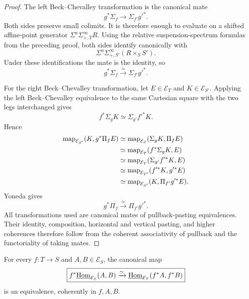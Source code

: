 \begin{proof}
The left Beck--Chevalley transformation is the canonical mate
\[
    g^*\Sigma_f\longrightarrow \Sigma_{f'} g'^*.
\]
Both sides preserve small colimits.  It is therefore enough to evaluate on a shifted affine-point
generator \(\Sigma^a\Sigma^\infty_{+,T}R\).  Using the relative suspension-spectrum formulas from
the preceding proof, both sides identify canonically with
\[
    \Sigma^a\Sigma^\infty_{+,S'}(R\times_SS').
\]
Under these identifications the mate is the identity, so
\[
    g^*\Sigma_f\xrightarrow{\simeq}\Sigma_{f'} g'^*.
\]

For the right Beck--Chevalley transformation, let \(E\in\mathcal E_T\) and
\(K\in\mathcal E_{S'}\).  Applying the left Beck--Chevalley equivalence to the same Cartesian
square with the two legs interchanged gives
\[
    f^*\Sigma_g K\simeq \Sigma_{g'} f'^*K.
\]
Hence
\[
\begin{aligned}
    \operatorname{map}_{\mathcal E_{S'}}(K,g^*\Pi_f E)
    &\simeq
    \operatorname{map}_{\mathcal E_S}(\Sigma_g K,\Pi_f E)
    \\
    &\simeq
    \operatorname{map}_{\mathcal E_T}(f^*\Sigma_g K,E)
    \\
    &\simeq
    \operatorname{map}_{\mathcal E_T}(\Sigma_{g'} f'^*K,E)
    \\
    &\simeq
    \operatorname{map}_{\mathcal E_{T'}}(f'^*K,g'^*E)
    \\
    &\simeq
    \operatorname{map}_{\mathcal E_{S'}}(K,\Pi_{f'} g'^*E).
\end{aligned}
\]
Yoneda gives
\[
    g^*\Pi_f\xrightarrow{\simeq}\Pi_{f'} g'^*.
\]
All transformations used are canonical mates of pullback-pasting equivalences.  Their identity,
composition, horizontal and vertical pasting, and higher coherences therefore follow from the
coherent associativity of pullback and the functoriality of taking mates.
\end{proof}

\begin{proposition}
\label{prop:monadic-de-rham-closed-base-change}
For every \(f:T\to S\) and \(A,B\in\mathcal E_S\), the canonical map
\[
\boxed{
    f^*\underline{\operatorname{Hom}}_{\mathcal E_S}(A,B)
    \xrightarrow{\simeq}
    \underline{\operatorname{Hom}}_{\mathcal E_T}(f^*A,f^*B)
}
\]
is an equivalence, coherently in \(f,A,B\).
\end{proposition}

